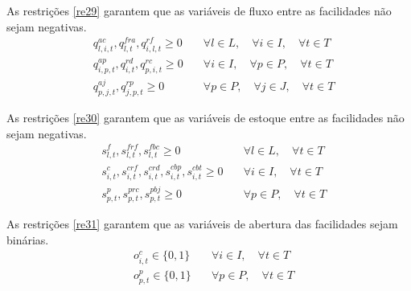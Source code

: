 As restrições \ref{re29} garantem que as variáveis de fluxo entre as facilidades não sejam negativas.
\begin{equation}\label{re29}
\begin{aligned}
& q^{ac}_{l,i,t}, q^{fra}_{l,t}, q^{rf}_{i,l,t} \geq 0 \quad & \forall l \in L, \quad \forall i \in I, \quad \forall t \in T \\
& q^{ap}_{i,p,t}, q^{rd}_{i,t}, q^{rc}_{p,i,t} \geq 0 \quad & \forall i \in I, \quad \forall p \in P, \quad \forall t \in T \\
& q^{aj}_{p,j,t}, q^{rp}_{j,p,t} \geq 0 \quad & \forall p \in P, \quad \forall j \in J, \quad \forall t \in T
\end{aligned}
\end{equation}

As restrições \ref{re30} garantem que as variáveis de estoque entre as facilidades não sejam negativas.
\begin{equation}\label{re30}
\begin{aligned}
& s^{f}_{l,t}, s^{frf}_{l,t}, s^{fbc}_{l,t} \geq 0 \quad & \forall l \in L, \quad \forall t \in T \\
& s^{c}_{i,t}, s^{crf}_{i,t}, s^{crd}_{i,t}, s^{cbp}_{i,t}, s^{cbt}_{i,t} \geq 0 \quad & \forall i \in I, \quad \forall t \in T \\
& s^{p}_{p,t}, s^{prc}_{p,t}, s^{pbj}_{p,t} \geq 0 \quad & \forall p \in P, \quad \forall t \in T
\end{aligned}
\end{equation}

As restrições \ref{re31} garantem que as variáveis de abertura das facilidades sejam binárias.
\begin{equation}\label{re31}
\begin{aligned}
& o^{c}_{i,t} \in \{0,1\} \quad & \forall i \in I, \quad \forall t \in T \\
& o^{p}_{p,t} \in \{0,1\} \quad & \forall p \in P, \quad \forall t \in T
\end{aligned}
\end{equation}




